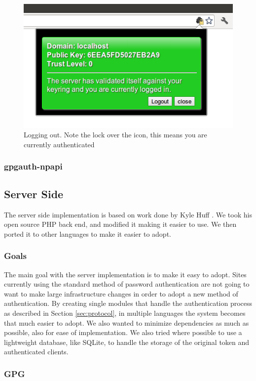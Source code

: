\documentclass[11pt]{article}
\begin{document}
\begin{figure}[h!]
\centering
\includegraphics[scale=0.5]{ext_logout}
\caption{Logging out. Note the lock over the icon, this means you are currently authenticated}
\label{fig:logout}
\end{figure}

\FloatBarrier
\subsubsection{gpgauth-npapi} \label{subsubsec:npapi}

\subsection{Server Side}
The server side implementation is based on work done by Kyle Huff \cite{gpgauth}. We took his open source PHP back end, and modified it making it easier to use. We then ported it to other languages to make it easier to adopt.
\subsubsection{Goals}
The main goal with the server implementation is to make it easy to adopt. Sites currently using the standard method of password authentication are not going to want to make large infrastructure changes in order to adopt a new method of authentication. By creating single modules that handle the authentication process as described in Section \ref{sec:protocol}, in multiple languages the system becomes that much easier to adopt. We also wanted to minimize dependencies as much as possible, also for ease of implementation. We also tried where possible to use a lightweight database, like SQLite, to handle the storage of the original token and authenticated clients. 
\subsubsection{GPG}
\end{document}

